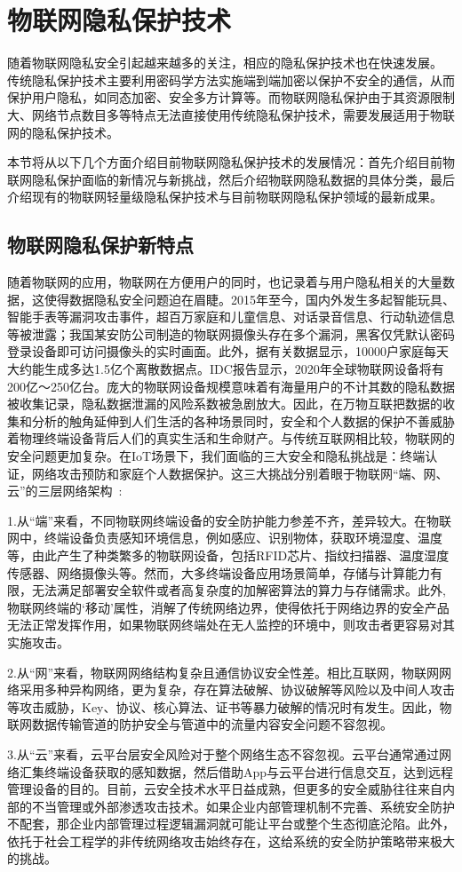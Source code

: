 \section{物联网隐私保护技术}
\label{protocol_security}
随着物联网隐私安全引起越来越多的关注，相应的隐私保护技术也在快速发展。
传统隐私保护技术主要利用密码学方法实施端到端加密以保护不安全的通信，从而保护用户隐私，如同态加密、安全多方计算等。而物联网隐私保护由于其资源限制大、网络节点数目多等特点无法直接使用传统隐私保护技术，需要发展适用于物联网的隐私保护技术。


本节将从以下几个方面介绍目前物联网隐私保护技术的发展情况：首先介绍目前物联网隐私保护面临的新情况与新挑战，然后介绍物联网隐私数据的具体分类，最后介绍现有的物联网轻量级隐私保护技术与目前物联网隐私保护领域的最新成果。


\subsection{物联网隐私保护新特点}
\label{common_security}

随着物联网的应用，物联网在方便用户的同时，也记录着与用户隐私相关的大量数据，这使得数据隐私安全问题迫在眉睫。2015年至今，国内外发生多起智能玩具、智能手表等漏洞攻击事件，超百万家庭和儿童信息、对话录音信息、行动轨迹信息等被泄露；我国某安防公司制造的物联网摄像头存在多个漏洞，黑客仅凭默认密码登录设备即可访问摄像头的实时画面。此外，据有关数据显示，10000户家庭每天大约能生成多达1.5亿个离散数据点。IDC报告显示，2020年全球物联网设备将有200亿～250亿台。庞大的物联网设备规模意味着有海量用户的不计其数的隐私数据被收集记录，隐私数据泄漏的风险系数被急剧放大。因此，在万物互联把数据的收集和分析的触角延伸到人们生活的各种场景同时，安全和个人数据的保护不善威胁着物理终端设备背后人们的真实生活和生命财产。与传统互联网相比较，物联网的安全问题更加复杂。在IoT场景下，我们面临的三大安全和隐私挑战是：终端认证，网络攻击预防和家庭个人数据保护。这三大挑战分别着眼于物联网“端、网、云”的三层网络架构~\cite{wenti2019}:
\par1.从“端”来看，不同物联网终端设备的安全防护能力参差不齐，差异较大。在物联网中，终端设备负责感知环境信息，例如感应、识别物体，获取环境湿度、温度等，由此产生了种类繁多的物联网设备，包括RFID芯片、指纹扫描器、温度湿度传感器、网络摄像头等。然而，大多终端设备应用场景简单，存储与计算能力有限，无法满足部署安全软件或者高复杂度的加解密算法的算力与存储需求。此外,物联网终端的‘移动’属性，消解了传统网络边界，使得依托于网络边界的安全产品无法正常发挥作用，如果物联网终端处在无人监控的环境中，则攻击者更容易对其实施攻击。
\par2.从“网”来看，物联网网络结构复杂且通信协议安全性差。相比互联网，物联网网络采用多种异构网络，更为复杂，存在算法破解、协议破解等风险以及中间人攻击等攻击威胁，Key、协议、核心算法、证书等暴力破解的情况时有发生。因此，物联网数据传输管道的防护安全与管道中的流量内容安全问题不容忽视。
\par3.从“云”来看，云平台层安全风险对于整个网络生态不容忽视。云平台通常通过网络汇集终端设备获取的感知数据，然后借助App与云平台进行信息交互，达到远程管理设备的目的。目前，云安全技术水平日益成熟，但更多的安全威胁往往来自内部的不当管理或外部渗透攻击技术。如果企业内部管理机制不完善、系统安全防护不配套，那企业内部管理过程逻辑漏洞就可能让平台或整个生态彻底沦陷。此外，依托于社会工程学的非传统网络攻击始终存在，这给系统的安全防护策略带来极大的挑战。\par

